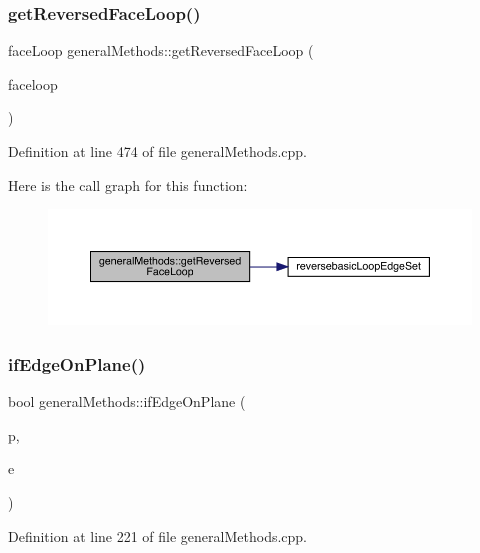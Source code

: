 \subsubsection{\texorpdfstring{get\+Reversed\+Face\+Loop()}{getReversedFaceLoop()}}
{\footnotesize\ttfamily face\+Loop general\+Methods\+::get\+Reversed\+Face\+Loop (\begin{DoxyParamCaption}\item[{face\+Loop}]{faceloop }\end{DoxyParamCaption})}



Definition at line 474 of file general\+Methods.\+cpp.

Here is the call graph for this function\+:
\nopagebreak
\begin{figure}[H]
\begin{center}
\leavevmode
\includegraphics[width=350pt]{namespacegeneral_methods_afe4087e253b318326a0a1578d34b42ca_cgraph}
\end{center}
\end{figure}
\mbox{\label{namespacegeneral_methods_a21d2e8c181e8cac3762d9ca1871d2168}} 
\subsubsection{\texorpdfstring{if\+Edge\+On\+Plane()}{ifEdgeOnPlane()}}
{\footnotesize\ttfamily bool general\+Methods\+::if\+Edge\+On\+Plane (\begin{DoxyParamCaption}\item[{plane}]{p,  }\item[{edge3D}]{e }\end{DoxyParamCaption})}



Definition at line 221 of file general\+Methods.\+cpp.

